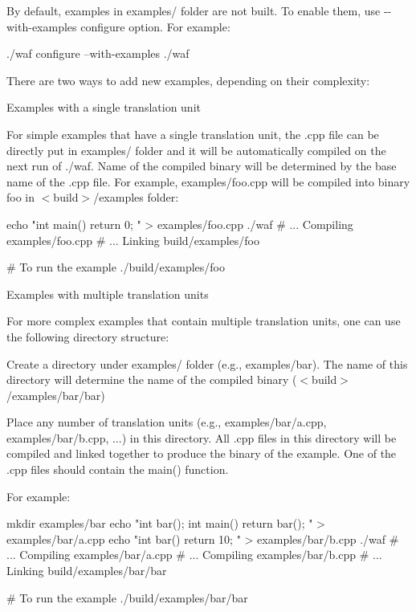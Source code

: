 By default, examples in {\ttfamily examples/} folder are not built. To enable them, use {\ttfamily -\/-\/with-\/examples} configure option. For example\+: \begin{DoxyVerb}./waf configure --with-examples
./waf
\end{DoxyVerb}


There are two ways to add new examples, depending on their complexity\+:


\begin{DoxyEnumerate}
\item Examples with a single translation unit

For simple examples that have a single translation unit, the {\ttfamily .cpp} file can be directly put in {\ttfamily examples/} folder and it will be automatically compiled on the next run of {\ttfamily ./waf}. Name of the compiled binary will be determined by the base name of the {\ttfamily .cpp} file. For example, {\ttfamily examples/foo.\+cpp} will be compiled into binary {\ttfamily foo} in {\ttfamily $<$build$>$/examples} folder\+: \begin{DoxyVerb}  echo "int main() { return 0; }" > examples/foo.cpp
  ./waf
  # ... Compiling examples/foo.cpp
  # ... Linking build/examples/foo

  # To run the example
  ./build/examples/foo
\end{DoxyVerb}

\item Examples with multiple translation units

For more complex examples that contain multiple translation units, one can use the following directory structure\+:
\begin{DoxyItemize}
\item Create a directory under {\ttfamily examples/} folder (e.\+g., {\ttfamily examples/bar}). The name of this directory will determine the name of the compiled binary ({\ttfamily $<$build$>$/examples/bar/bar})
\item Place any number of translation units (e.\+g., {\ttfamily examples/bar/a.\+cpp}, {\ttfamily examples/bar/b.\+cpp}, ...) in this directory. All {\ttfamily .cpp} files in this directory will be compiled and linked together to produce the binary of the example. One of the .cpp files should contain the {\ttfamily main()} function.
\end{DoxyItemize}

For example\+: \begin{DoxyVerb}  mkdir examples/bar
  echo "int bar(); int main() { return bar(); }" > examples/bar/a.cpp
  echo "int bar() { return 10; } " > examples/bar/b.cpp
  ./waf
  # ... Compiling examples/bar/a.cpp
  # ... Compiling examples/bar/b.cpp
  # ... Linking build/examples/bar/bar

  # To run the example
  ./build/examples/bar/bar\end{DoxyVerb}
 
\end{DoxyEnumerate}
